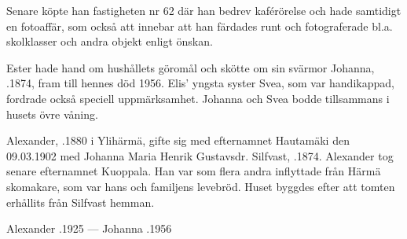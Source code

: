 Senare köpte han fastigheten nr 62 där han bedrev kaférörelse och hade samtidigt en fotoaffär, som också att innebar att han färdades runt och fotograferade bl.a. skolklasser och andra objekt enligt önskan.

Ester hade hand om hushållets göromål och skötte om sin svärmor Johanna, .1874, fram till hennes död 1956. Elis' yngsta syster Svea, som var handikappad, fordrade också speciell uppmärksamhet. Johanna och Svea bodde tillsammans i husets övre våning.
\begin{jhchildren}
  \item {}
  \item {}
\end{jhchildren}


Alexander, .1880 i Ylihärmä, gifte sig med efternamnet Hautamäki den 09.03.1902 med Johanna Maria Henrik Gustavsdr. Silfvast, .1874. Alexander tog senare efternamnet Kuoppala. Han var som flera andra inflyttade från Härmä skomakare, som var hans och familjens levebröd. Huset byggdes efter att tomten erhållits från Silfvast hemman.
\begin{jhchildren}
  \item {}
  \item {}
  \item {}
  \item {}
  \item {}
  \item {}
  \item {}
  \item {}
\end{jhchildren}

Alexander .1925  ---  Johanna .1956



